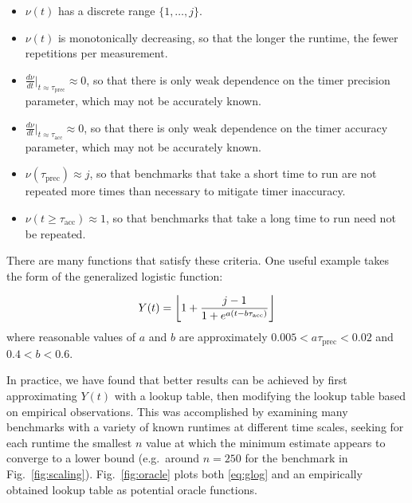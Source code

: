 \documentclass[conference]{IEEEtran}
\DeclarePairedDelimiter\floor{\lfloor}{\rfloor}
\begin{document}
\begin{itemize}
    \item $\nu(t)$ has a discrete range $\{1, \dots, j\}$.
    \item $\nu(t)$ is monotonically decreasing, so that the longer the runtime, the fewer repetitions per measurement.
    \item $\frac{d\nu}{dt}|_{t \approx \tau_{\textrm{prec}}} \approx 0$,
    so that there is only weak dependence on the timer precision parameter,
    which may not be accurately known.
    \item $\frac{d\nu}{dt}|_{t \approx \tau_{\textrm{acc}}} \approx 0$,
    so that there is only weak dependence on the timer accuracy parameter,
    which may not be accurately known.
    \item $\nu(\tau_{\textrm{prec}}) \approx j$, so that benchmarks that take a     short time to run are not repeated more times than necessary to mitigate timer inaccuracy.
    \item $\nu(t \ge \tau_{\textrm{acc}}) \approx 1$, so that benchmarks that take a long time to run need not be repeated.
\end{itemize}

There are many functions that satisfy these criteria. One useful example takes
the form of the generalized logistic function:

\begin{equation}
\label{eq:glog}
    Y(t) = \floor*{1 + \frac{j - 1}{1 + e^{a (t - b \tau_{\textrm{acc}})}}}
\end{equation}
%
where reasonable values of $a$ and $b$ are approximately $0.005 < a \tau_{\textrm{prec}} < 0.02$ and $0.4 < b <
0.6$.

In practice, we have found that better results can be achieved by first
approximating $Y(t)$ with a lookup table, then modifying the lookup table based
on empirical observations. This was accomplished by examining many benchmarks
with a variety of known runtimes at different time scales, seeking for each
runtime the smallest $n$ value at which the minimum estimate appears to
converge to a lower bound (e.g.\ around $n = 250$ for the benchmark in
Fig.~\ref{fig:scaling}). Fig.~\ref{fig:oracle} plots both \eqref{eq:glog} and an
empirically obtained lookup table as potential oracle functions.
\end{document}
